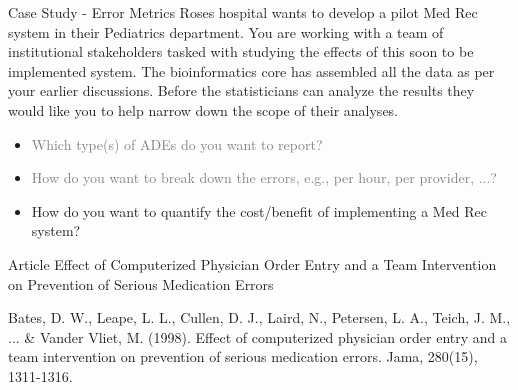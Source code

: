 \documentclass[10pt]{beamer}
\begin{document}
\begin{frame}{Case Study - Error Metrics}
	Roses hospital wants to develop a pilot Med Rec system in their Pediatrics department.  You are working with a team of institutional stakeholders tasked with studying the effects of this soon to be implemented system.  The bioinformatics core has assembled all the data as per your earlier discussions.  Before the statisticians can analyze the results they would like you to help narrow down the scope of their analyses.
	\begin{itemize}
		\item \textcolor<2->{gray}{Which type(s) of ADEs do you want to report?}
		\item \textcolor<2->{gray}{How do you want to break down the errors, e.g., per hour, per provider, ...?}
		\item<2-> How do you want to quantify the cost/benefit of implementing a Med Rec system?
	\end{itemize}	 
\end{frame}


\begin{frame}{Article}
	\Large{Effect of Computerized Physician Order Entry and a Team Intervention on Prevention of Serious Medication Errors}
	
	
	\scriptsize{Bates, D. W., Leape, L. L., Cullen, D. J., Laird, N., Petersen, L. A., Teich, J. M., ... \& Vander Vliet, M. (1998). Effect of computerized physician order entry and a team intervention on prevention of serious medication errors. Jama, 280(15), 1311-1316.}
\end{frame}
\end{document}
